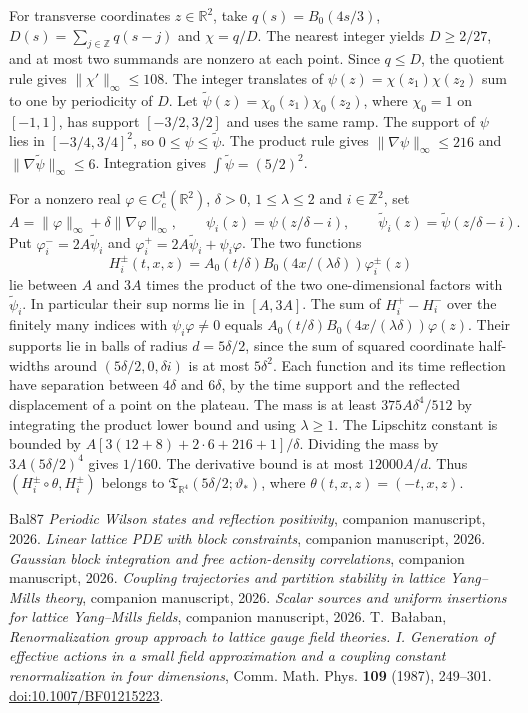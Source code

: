 \documentclass[11pt,letterpaper,reqno]{amsart}
\numberwithin{equation}{section}
\theoremstyle{definition}
\theoremstyle{remark}
\begin{document}
For transverse coordinates \(z\in\mathbb R^2\), take
\(q(s)=B_0(4s/3)\), \(D(s)=\sum_{j\in\mathbb Z}q(s-j)\) and
\(\chi=q/D\). The nearest integer yields \(D\ge2/27\), and at
most two summands are nonzero at each point. Since \(q\le D\),
the quotient rule gives \(\|\chi'\|_\infty\le108\).
The integer translates of \(\psi(z)=\chi(z_1)\chi(z_2)\) sum
to one by periodicity of \(D\). Let
\(\widetilde\psi(z)=\chi_0(z_1)\chi_0(z_2)\), where \(\chi_0=1\)
on \([-1,1]\), has support \([-3/2,3/2]\) and uses the same
ramp. The support of \(\psi\) lies in \([-3/4,3/4]^2\), so
\(0\le\psi\le\widetilde\psi\). The product rule gives
\(\|\nabla\psi\|_\infty\le216\) and
\(\|\nabla\widetilde\psi\|_\infty\le6\).
Integration gives \(\int\widetilde\psi=(5/2)^2\).

For a nonzero real \(\varphi\in C_c^1(\mathbb R^2)\),
\(\delta>0\), \(1\le\lambda\le2\) and \(i\in\mathbb Z^2\), set
\[
 A=\|\varphi\|_\infty+\delta\|\nabla\varphi\|_\infty,\qquad
 \psi_i(z)=\psi(z/\delta-i),\qquad
 \widetilde\psi_i(z)=\widetilde\psi(z/\delta-i).
\]
Put \(\varphi_i^-=2A\widetilde\psi_i\) and
\(\varphi_i^+=2A\widetilde\psi_i+\psi_i\varphi\).
The two functions
\[
 H_i^\pm(t,x,z)=A_0(t/\delta)B_0(4x/(\lambda\delta))
 \varphi_i^\pm(z)
\]
lie between \(A\) and \(3A\) times the product of the two
one-dimensional factors with \(\widetilde\psi_i\).
In particular their sup norms lie in \([A,3A]\).
The sum of \(H_i^+-H_i^-\) over the finitely many indices
with \(\psi_i\varphi\ne0\) equals
\(A_0(t/\delta)B_0(4x/(\lambda\delta))\varphi(z)\).
Their supports lie in balls of radius \(d=5\delta/2\), since
the sum of squared coordinate half-widths around
\((5\delta/2,0,\delta i)\) is at most \(5\delta^2\).
Each function and its time reflection have separation
between \(4\delta\) and \(6\delta\), by the time support
and the reflected displacement of a point on the plateau.
The mass is at least \(375A\delta^4/512\) by integrating the
product lower bound and using \(\lambda\ge1\).
The Lipschitz constant is bounded by
\(A[3(12+8)+2\cdot6+216+1]/\delta\).
Dividing the mass by \(3A(5\delta/2)^4\) gives \(1/160\).
The derivative bound is at most \(12000A/d\).
Thus \((H_i^\pm\circ\theta,H_i^\pm)\) belongs to
\(\mathfrak T_{\mathbb R^4}(5\delta/2;\vartheta_*)\),
where \(\theta(t,x,z)=(-t,x,z)\).


\begin{thebibliography}{Bal87}
\small
{} \emph{Periodic Wilson states and reflection positivity}, companion manuscript, 2026.
 \emph{Linear lattice PDE with block constraints}, companion manuscript, 2026.
 \emph{Gaussian block integration and free action-density correlations}, companion manuscript, 2026.
 \emph{Coupling trajectories and partition stability in lattice Yang--Mills theory}, companion manuscript, 2026.
 \emph{Scalar sources and uniform insertions for lattice Yang--Mills fields}, companion manuscript, 2026.
 T.~Ba{\l}aban, \emph{Renormalization group approach to lattice gauge field theories. I. Generation of effective actions in a small field approximation and a coupling constant renormalization in four dimensions}, Comm. Math. Phys. \textbf{109} (1987), 249--301. \href{https://doi.org/10.1007/BF01215223}{doi:10.1007/BF01215223}.
\end{thebibliography}
\end{document}
